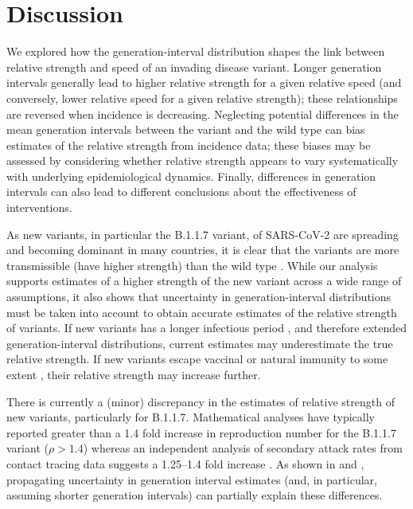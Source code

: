 \documentclass[12pt]{article}
\begin{document}
\section{Discussion}

We explored how the generation-interval distribution shapes the link between relative strength and speed of an invading disease variant.
Longer generation intervals generally lead to higher relative strength for a given relative speed (and conversely, lower relative speed for a given relative strength); these relationships are reversed when incidence is decreasing.
Neglecting potential differences in the mean generation intervals between the variant and the wild type can bias estimates of the relative strength from incidence data;
these biases may be assessed by considering whether relative strength appears to vary systematically with underlying epidemiological dynamics.
Finally, differences in generation intervals can also lead to different conclusions about the effectiveness of interventions.

As new variants, in particular the B.1.1.7 variant, of SARS-CoV-2 are spreading and becoming dominant in many countries, it is clear that the variants are more transmissible (have higher strength) than the wild type \citep{switzerland2021variant, davies2021estimated, di2021impact, graham2021changes, leung2021early, volz2021transmission,zhao2021}.
While our analysis supports estimates of a higher strength of the new variant across a wide range of assumptions, it also shows that uncertainty in generation-interval distributions must be taken into account to obtain accurate estimates of the relative strength of variants.
If new variants has a longer infectious period \citep{kissler2021densely}, and therefore extended generation-interval distributions, current estimates may underestimate the true relative strength.
If new variants escape vaccinal or natural immunity to some extent \citep{Kupferschmidt329}, their relative strength may increase further.

There is currently a (minor) discrepancy in the estimates of relative strength of new variants, particularly for B.1.1.7.
Mathematical analyses have typically reported greater than a 1.4 fold increase in reproduction number for the B.1.1.7 variant ($\rho > 1.4$) whereas an independent analysis of secondary attack rates from contact tracing data suggests a 1.25--1.4 fold increase \citep{ukinvest}.
As shown in \cite{davies2021estimated} and \cite{volz2021transmission}, propagating uncertainty in generation interval estimates (and, in particular, assuming shorter generation intervals) can partially explain these differences.
\end{document}
